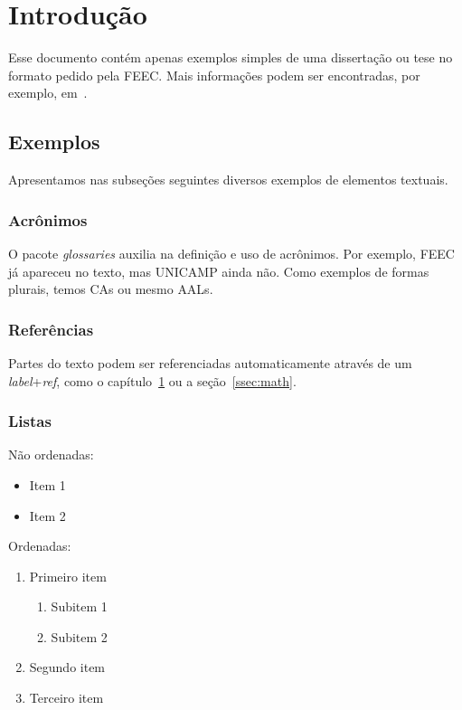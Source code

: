 \chapter{Introdução}
\label{cap:intro}

Esse documento contém apenas exemplos simples de uma dissertação ou tese no formato pedido pela \gls{FEEC}.
Mais informações podem ser encontradas, por exemplo, em~\cite{oetiker_not_2015,latex_wikibook}.


\section{Exemplos}

Apresentamos nas subseções seguintes diversos exemplos de elementos textuais.


\subsection{Acrônimos}

O pacote \emph{glossaries} auxilia na definição e uso de acrônimos.
Por exemplo, \gls{FEEC} já apareceu no texto, mas \gls{UNICAMP} ainda não.
Como exemplos de formas plurais, temos \glspl{CA} ou mesmo \glspl{AAL}.


\subsection{Referências}

Partes do texto podem ser referenciadas automaticamente através de um \emph{label}+\emph{ref}, como o capítulo~\ref{cap:intro} ou a seção~\ref{ssec:math}.


\subsection{Listas}

Não ordenadas:

\begin{itemize}
	\item Item 1
	\item Item 2
\end{itemize}

Ordenadas:

\begin{enumerate}
	\item Primeiro item
	\begin{enumerate}
		\item Subitem 1
		\item Subitem 2
	\end{enumerate}
	\item Segundo item
	\item Terceiro item
\end{enumerate}


